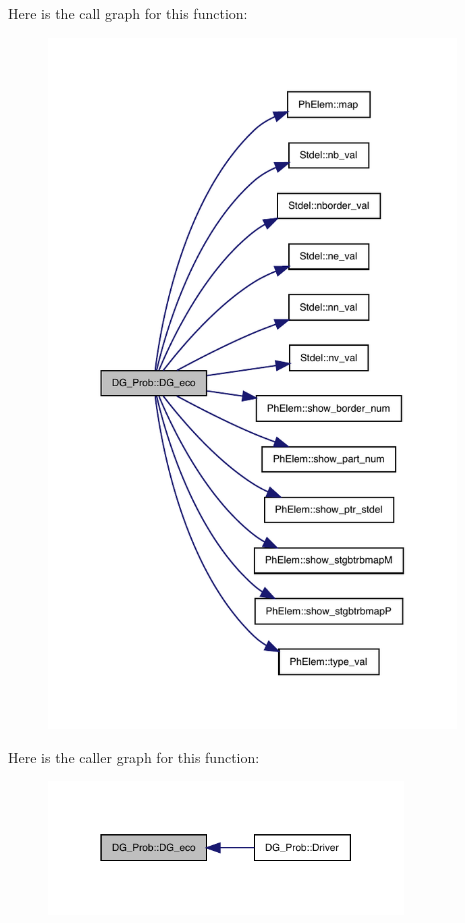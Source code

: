 Here is the call graph for this function\+:
\nopagebreak
\begin{figure}[H]
\begin{center}
\leavevmode
\includegraphics[width=307pt]{classDG__Prob_a88ea70f33384c520034fab83e7db8e7e_cgraph}
\end{center}
\end{figure}
Here is the caller graph for this function\+:
\nopagebreak
\begin{figure}[H]
\begin{center}
\leavevmode
\includegraphics[width=267pt]{classDG__Prob_a88ea70f33384c520034fab83e7db8e7e_icgraph}
\end{center}
\end{figure}
\mbox{\label{classDG__Prob_a0c085b8fc3c827c37aa8733a2842a97f}} 
